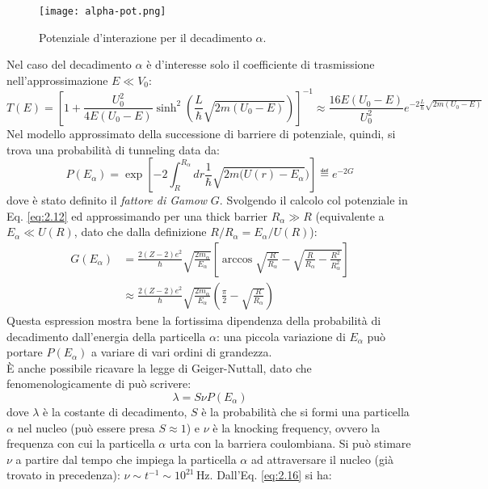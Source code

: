 \begin{figure}[!hb]
	\centering
	\texttt{[image: alpha-pot.png]}
	\caption{Potenziale d'interazione per il decadimento $ \alpha $.}
	\label{alpha-pot}
\end{figure}

Nel caso del decadimento $ \alpha $ è d'interesse solo il coefficiente di trasmissione nell'approssimazione $ E \ll V_0 $:
\begin{equation}
	T(E) = \left[ 1 + \frac{U_0^2}{4E (U_0 - E)} \sinh^2 \left( \frac{L}{\hbar} \sqrt { 2m (U_0 - E)} \right) \right]^{-1} \approx \frac{16 E (U_0 - E)}{U_0^2} e^{-2 \frac{L}{\hbar} \sqrt{2m (U_0 - E)}}
	\label{eq:2.13}
\end{equation}
Nel modello approssimato della successione di barriere di potenziale, quindi, si trova una probabilità di tunneling data da:
\begin{equation}
	P(E_{\alpha}) = \exp{\left[ -2 \int_{R}^{R_{\alpha}} dr \frac{1}{\hbar} \sqrt{2 m (U(r) - E_{\alpha}}) \right]} \eqdef e^{-2G}
	\label{eq:2.14}
\end{equation}
dove è stato definito il \textit{fattore di Gamow} $ G $. Svolgendo il calcolo col potenziale in Eq. \ref{eq:2.12} ed approssimando per una thick barrier $ R_{\alpha} \gg R $ (equivalente a $ E_{\alpha} \ll U(R) $, dato che dalla definizione $ R / R_{\alpha} = E_{\alpha} / U(R) $):
\begin{equation}
	\begin{split}
		G(E_{\alpha})
		&= \frac{2 (Z - 2) e^2}{\hbar} \sqrt{\frac{2m_{\alpha}}{E_\alpha}} \left[ \arccos \sqrt{\frac{R}{R_{\alpha}}} - \sqrt{\frac{R}{R_{\alpha}} - \frac{R^2}{R^2_{\alpha}}} \right]\\
		&\approx \frac{2 (Z - 2) e^2}{\hbar} \sqrt{\frac{2m_{\alpha}}{E_{\alpha}}} \left( \frac{\pi}{2} - \sqrt{\frac{R}{R_{\alpha}}} \right)
	\end{split}
	\label{eq:2.15}
\end{equation}
Questa espression mostra bene la fortissima dipendenza della probabilità di decadimento dall'energia della particella $ \alpha $: una piccola variazione di $ E_{\alpha} $ può portare $ P(E_{\alpha}) $ a variare di vari ordini di grandezza.\\
È anche possibile ricavare la legge di Geiger-Nuttall, dato che fenomenologicamente di può scrivere:
\begin{equation}
	\lambda = S \nu P(E_{\alpha})
	\label{eq:2.16}
\end{equation}
dove $ \lambda $ è la costante di decadimento, $ S $ è la probabilità che si formi una particella $ \alpha $ nel nucleo (può essere presa $ S \approx 1 $) e $ \nu $ è la knocking frequency, ovvero la frequenza con cui la particella $ \alpha $ urta con la barriera coulombiana. Si può stimare $ \nu $ a partire dal tempo che impiega la particella $ \alpha $ ad attraversare il nucleo (già trovato in precedenza): $ \nu \sim t^{-1} \sim 10^{21} \,\text{Hz} $. Dall'Eq. \ref{eq:2.16} si ha:
